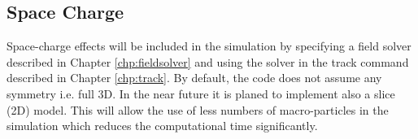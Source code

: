                                                                                 
%  
%                                                                                                                                                                                                                
%      


\subsection{Space Charge}
\label{sec:opalFlavours:spacecharge}
Space-charge effects will be included in the simulation by specifying a field solver described in Chapter \ref{chp:fieldsolver} and using the solver in the
track command described in Chapter \ref{chp:track}. 
By default, the code does not assume any symmetry i.e. full 3D. In the near future it is planed to implement also a slice (2D) model.
This will allow the use of less numbers of macro-particles in the simulation which reduces the computational time
significantly. 


